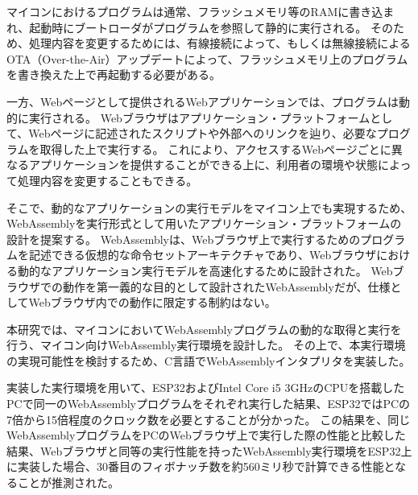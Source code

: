 \begin{jabstract}

  マイコンにおけるプログラムは通常、フラッシュメモリ等のRAMに書き込まれ、起動時にブートローダがプログラムを参照して静的に実行される。
  そのため、処理内容を変更するためには、有線接続によって、もしくは無線接続によるOTA（Over-the-Air）アップデートによって、フラッシュメモリ上のプログラムを書き換えた上で再起動する必要がある。

  一方、Webページとして提供されるWebアプリケーションでは、プログラムは動的に実行される。
  Webブラウザはアプリケーション・プラットフォームとして、Webページに記述されたスクリプトや外部へのリンクを辿り、必要なプログラムを取得した上で実行する。
  これにより、アクセスするWebページごとに異なるアプリケーションを提供することができる上に、利用者の環境や状態によって処理内容を変更することもできる。

  そこで、動的なアプリケーションの実行モデルをマイコン上でも実現するため、WebAssemblyを実行形式として用いたアプリケーション・プラットフォームの設計を提案する。
  WebAssemblyは、Webブラウザ上で実行するためのプログラムを記述できる仮想的な命令セットアーキテクチャであり、Webブラウザにおける動的なアプリケーション実行モデルを高速化するために設計された。
  Webブラウザでの動作を第一義的な目的として設計されたWebAssemblyだが、仕様としてWebブラウザ内での動作に限定する制約はない。

  本研究では、マイコンにおいてWebAssemblyプログラムの動的な取得と実行を行う、マイコン向けWebAssembly実行環境を設計した。
  その上で、本実行環境の実現可能性を検討するため、C言語でWebAssemblyインタプリタを実装した。

  実装した実行環境を用いて、ESP32およびIntel Core i5 3GHzのCPUを搭載したPCで同一のWebAssemblyプログラムをそれぞれ実行した結果、ESP32ではPCの7倍から15倍程度のクロック数を必要とすることが分かった。
  この結果を、同じWebAssemblyプログラムをPCのWebブラウザ上で実行した際の性能と比較した結果、Webブラウザと同等の実行性能を持ったWebAssembly実行環境をESP32上に実装した場合、30番目のフィボナッチ数を約560ミリ秒で計算できる性能となることが推測された。

\end{jabstract}
